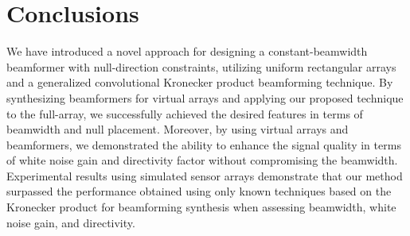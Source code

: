 \section{Conclusions}
\label{sec:conclusions}

We have introduced a novel approach for designing a constant-beamwidth beamformer with null-direction constraints, utilizing uniform rectangular arrays and a generalized convolutional Kronecker product beamforming technique. By synthesizing beamformers for virtual arrays and applying our proposed technique to the full-array, we successfully achieved the desired features in terms of beamwidth and null placement. Moreover, by using virtual arrays and beamformers, we demonstrated the ability to enhance the signal quality in terms of white noise gain and directivity factor without compromising the beamwidth. Experimental results using simulated sensor arrays demonstrate that our method surpassed the performance obtained using only known techniques based on the Kronecker product for beamforming synthesis when assessing beamwidth, white noise gain, and directivity.